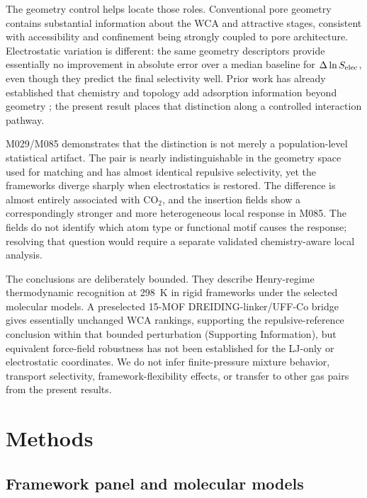 \documentclass[11pt,a4paper]{article}
\begin{document}
The geometry control helps locate those roles. Conventional pore geometry contains substantial information about the WCA and attractive stages, consistent with accessibility and confinement being strongly coupled to pore architecture. Electrostatic variation is different: the same geometry descriptors provide essentially no improvement in absolute error over a median baseline for $\Delta\ln S_{\rm elec}$, even though they predict the final selectivity well. Prior work has already established that chemistry and topology add adsorption information beyond geometry \cite{anderson2018porechemistry,moosavi2020diversity,burner2020deeplearning}; the present result places that distinction along a controlled interaction pathway.

M029/M085 demonstrates that the distinction is not merely a population-level statistical artifact. The pair is nearly indistinguishable in the geometry space used for matching and has almost identical repulsive selectivity, yet the frameworks diverge sharply when electrostatics is restored. The difference is almost entirely associated with CO$_2$, and the insertion fields show a correspondingly stronger and more heterogeneous local response in M085. The fields do not identify which atom type or functional motif causes the response; resolving that question would require a separate validated chemistry-aware local analysis.

The conclusions are deliberately bounded. They describe Henry-regime thermodynamic recognition at 298~K in rigid frameworks under the selected molecular models. A preselected 15-MOF DREIDING-linker/UFF-Co bridge gives essentially unchanged WCA rankings, supporting the repulsive-reference conclusion within that bounded perturbation (Supporting Information), but equivalent force-field robustness has not been established for the LJ-only or electrostatic coordinates. We do not infer finite-pressure mixture behavior, transport selectivity, framework-flexibility effects, or transfer to other gas pairs from the present results.

\section{Methods}

\subsection{Framework panel and molecular models}
\end{document}
